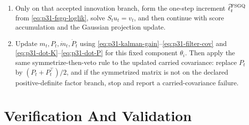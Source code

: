 \documentclass[11pt]{article}
\numberwithin{equation}{section}
\newcommand{\ellhat}{\widehat\ell}
\begin{document}
{\begin{minipage}{0.94\linewidth}
\begin{enumerate}[leftmargin=0.22in]
an innovation-branch failure.
\item Only on that accepted innovation branch, form the one-step increment
\(\ellhat_t^{\rm FSGQ}\) from \eqref{eq:p31-fsgq-loglik}, solve \(S_tu_t=v_t\),
and then continue with score accumulation and the Gaussian projection update.
\item Update \(m_t,P_t,\dot m_t,\dot P_t\) using
\eqref{eq:p31-kalman-gain}--\eqref{eq:p31-filter-cov} and
\eqref{eq:p31-dot-K}--\eqref{eq:p31-dot-P} for this fixed component
\(\theta_i\).  Then apply the same symmetrize-then-veto rule to the updated
carried covariance: replace \(P_t\) by \((P_t+P_t^\top)/2\), and if the
symmetrized matrix is not on the declared positive-definite factor branch, stop
and report a carried-covariance failure.
\end{enumerate}
\end{minipage}}

\section{Verification And Validation}
\label{sec:p31-fd}
\end{document}
